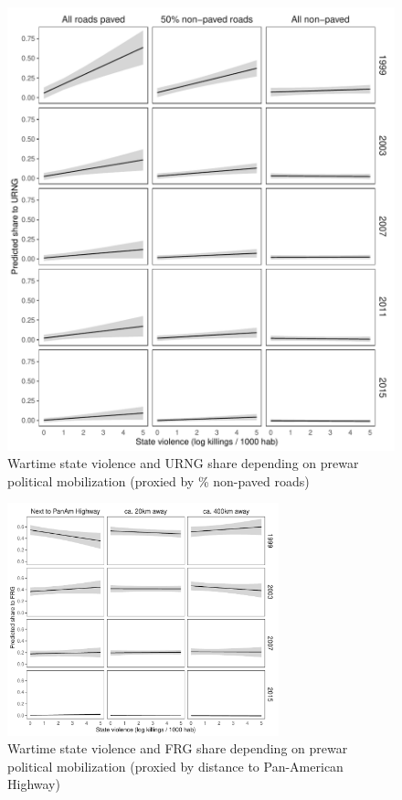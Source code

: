 \documentclass[a4paper, 12pt, notitlepage]{article}
\begin{document}
\begin{figure}[htb!]
  \centering
    \includegraphics[width = \textwidth]{img/pp_URNG_roads_year}

  \caption{Wartime state violence and URNG share depending on prewar political mobilization (proxied by \% non-paved roads)} \label{fig:pp_URNG_roads_yrs}

\end{figure}

\begin{figure}[htb!]
  \centering
    \includegraphics[width = 0.7\textwidth]{img/pp_FRG_panam_year}

  \caption{Wartime state violence and FRG share depending on prewar political mobilization (proxied by distance to Pan-American Highway)} \label{fig:pp_FRG_panam_yrs}

\end{figure}
\end{document}
